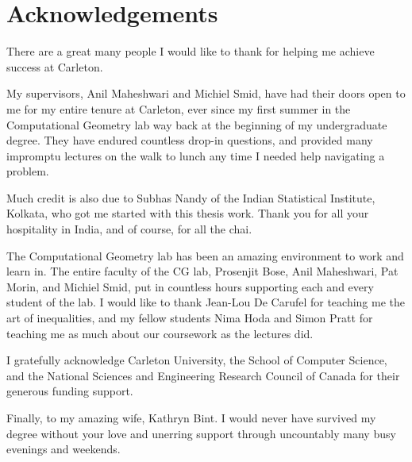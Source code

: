 \chapter*{Acknowledgements}

There are a great many people I would like to thank for helping me achieve success at Carleton.

My supervisors, Anil Maheshwari and Michiel Smid, have had their doors open to me for my entire tenure at Carleton, ever since my first summer in the Computational Geometry lab way back at the beginning of my undergraduate degree. 
They have endured countless drop-in questions, and provided many impromptu lectures on the walk to lunch any time I needed help navigating a problem.

Much credit is also due to Subhas Nandy of the Indian Statistical Institute, Kolkata, who got me started with this thesis work. 
Thank you for all your hospitality in India, and of course, for all the chai.

The Computational Geometry lab has been an amazing environment to work and learn in. 
The entire faculty of the CG lab, Prosenjit Bose, Anil Maheshwari, Pat Morin, and Michiel Smid, put in countless hours supporting each and every student of the lab. 
I would like to thank Jean-Lou De Carufel for teaching me the art of inequalities, and my fellow students Nima Hoda and Simon Pratt for teaching me as much about our coursework as the lectures did.

I gratefully acknowledge Carleton University, the School of Computer Science, and the National Sciences and Engineering Research Council of Canada for their generous funding support.

Finally, to my amazing wife, Kathryn Bint. 
I would never have survived my degree without your love and unerring support through uncountably many busy evenings and weekends.
